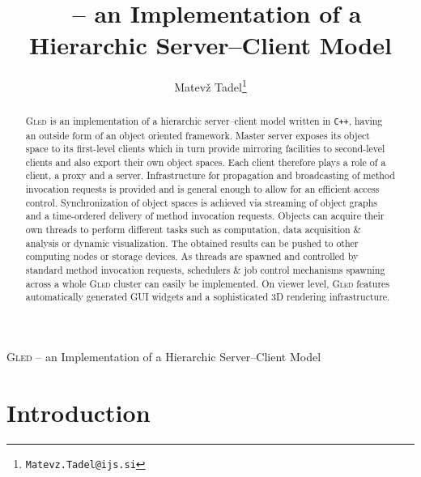 \documentclass[a4paper,11pt]{article}
\title{\gled\ -- an Implementation of a Hierarchic Server--Client Model}
\author{Matev\v{z} Tadel\thanks{\tt Matevz.Tadel@ijs.si}}
\def\gled{\textsc{Gled}\xspace}
\def\smalltt#1{{\small\texttt{#1}}}
\begin{document}
\maketitle

\begin{abstract}
  \gled is an implementation of a hierarchic server--client model
  written in \smalltt{C++}, having an outside form of an object
  oriented framework. Master server exposes its object space to its
  first-level clients which in turn provide mirroring facilities to
  second-level clients and also export their own object spaces. Each
  client therefore plays a role of a client, a proxy and a server.
  Infrastructure for propagation and broadcasting of method invocation
  requests is provided and is general enough to allow for an efficient
  access control. Synchronization of object spaces is achieved via
  streaming of object graphs and a time-ordered delivery of method
  invocation requests.
%
  Objects can acquire their own threads to perform different tasks
  such as computation, data acquisition \& analysis or dynamic
  visualization. The obtained results can be pushed to other computing
  nodes or storage devices. As threads are spawned and controlled
  by standard method invocation requests, schedulers \& job control
  mechanisms spawning across a whole \gled cluster can easily be
  implemented.
%
  On viewer level, \gled features automatically generated GUI widgets
  and a sophisticated 3D rendering infrastructure.
\end{abstract}


\pagestyle{myheadings}
\thispagestyle{plain}
\markboth{}
{\textsc{Gled} -- an Implementation of a Hierarchic Server--Client Model}

\section{Introduction}
\end{document}
